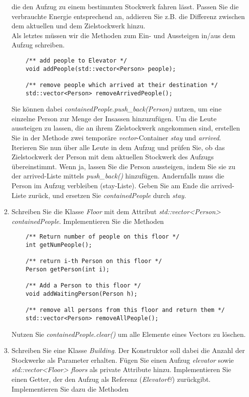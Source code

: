 \documentclass[
  accentcolor=tud1c,	%
  colorbacktitle,		%
  inverttitle,			%
  german,				%
  twoside
]{tudexercise}
\begin{document}
\begin{enumerate}
die den Aufzug zu einem bestimmten Stockwerk fahren lässt. Passen Sie die verbrauchte Energie entsprechend an, addieren Sie z.B. die Differenz zwischen dem aktuellen und dem Zielstockwerk hinzu.\\

Als letztes müssen wir die Methoden zum Ein- und Aussteigen in/aus dem Aufzug schreiben.
\begin{lstlisting}
	/** add people to Elevator */
	void addPeople(std::vector<Person> people);

	/** remove people which arrived at their destination */
	std::vector<Person> removeArrivedPeople();
\end{lstlisting} 

Sie können dabei \emph{containedPeople.push\_back(Person)} nutzen, um eine einzelne Person 
zur Menge der Insassen hinzuzufügen. Um die Leute aussteigen zu lassen, die an ihrem
  Zielstockwerk angekommen sind, erstellen Sie in der Methode zwei temporäre \emph{vector}-Container
   \emph{stay} und \emph{arrived}. Iterieren Sie nun über alle Leute in dem Aufzug und prüfen Sie, ob das Zielstockwerk der Person mit dem aktuellen Stockwerk des Aufzugs übereinstimmt.
    Wenn ja, lassen Sie die Person aussteigen, indem Sie sie zu der arrived-Liste mittels
     \emph{push\_back()} hinzufügen. Andernfalls muss die Person im Aufzug verbleiben (stay-Liste). 
     Geben Sie am Ende die arrived-Liste zurück, und ersetzen Sie \emph{containedPeople} durch \emph{stay}.

\item Schreiben Sie die Klasse \emph{Floor} mit dem Attribut \emph{std::vector<Person> containedPeople}. Implementieren Sie die Methoden

\begin{lstlisting}
	/** Return number of people on this floor */
	int getNumPeople();
	
	/** return i-th Person on this floor */
	Person getPerson(int i);
	
	/** Add a Person to this floor */
	void addWaitingPerson(Person h);
	
	/** remove all persons from this floor and return them */
	std::vector<Person> removeAllPeople();
\end{lstlisting}

Nutzen Sie \emph{containedPeople.clear()} um alle Elemente eines Vectors zu löschen.

\item
Schreiben Sie eine Klasse \emph{Building}. Der Konstruktor soll dabei die Anzahl der Stockwerke als Parameter erhalten. Fügen Sie einen Aufzug \emph{elevator} sowie \emph{std::vector<Floor> floors} als private Attribute hinzu. Implementieren Sie einen Getter, der den Aufzug als Referenz (\emph{Elevator\&}) zurückgibt. Implementieren Sie dazu die Methoden


\end{enumerate}
\end{document}
